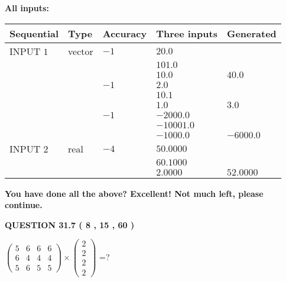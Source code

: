 \documentclass[12pt]{article}
\begin{document}
   
   
   
\noindent\vspace{0.1in}\hspace{-0.08in} {\textbf{\Large{All inputs: }}}
   
   
  
  
\noindent\begin{tabular}{|l|l|l|l|l|}
\hline
 Sequential & Type & Accuracy & Three inputs & Generated \\ 
\hline
 
 
  INPUT $            1 $ & vector & $           -1  $ & $
20.0
  $ & \\
  & & & $
101.0
  $ & \\
  & & & $
10.0
$ & $ 40.0 $ 
  \\
  & & $           -1  $ & $
2.0
  $ & \\
  & & & $
10.1
  $ & \\
  & & & $
1.0
$ & $ 3.0 $ 
  \\
  & & $           -1  $ & $
-2000.0
  $ & \\
  & & & $
-10001.0
  $ & \\
  & & & $
-1000.0
$ & $ -6000.0 $ 
 \\  \hline  
 
 
  INPUT $            2 $ & real & $           -4  $ & $
 50.0000
  $ & \\
  & & &  $
 60.1000
  $ & \\
  & & &  $
 2.0000
 $ & $ 52.0000 $ 
 \\  \hline  
 \end{tabular}
   
   
   
   
\vspace{0.3in}
{\textbf{\LARGE{You have done all the above? Excellent! Not much left, please continue.}}}
\vspace{0.3in}
   
   
  
\vspace{0.2in}
  
{\textbf{\Large{QUESTION
31.7 
 (           8 ,          15 ,          60 )
}}}
  
  
 
$ \left( \begin{array}{ccccccccc}
           5  & 
           6  & 
           6  & 
           6  \\ 
           6  & 
           4  & 
           4  & 
           4  \\ 
           5  & 
           6  & 
           5  & 
           5
\end{array}\right) \times
\left( \begin{array}{c}
           2  \\ 
           2  \\ 
           2  \\ 
           2
\end{array}\right) $ =?
 
\end{document}
